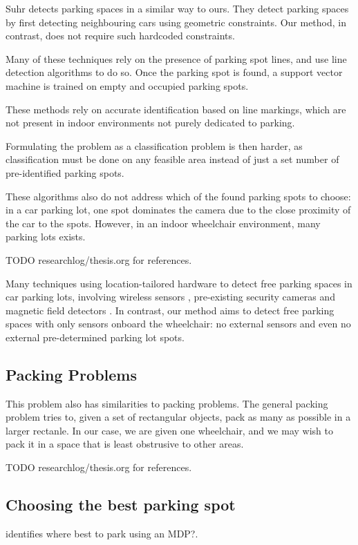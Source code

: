 Suhr \cite{suhr2010automatic} detects parking spaces in a similar way to ours.
They detect parking spaces by first detecting neighbouring cars using geometric
constraints. Our method, in contrast, does not require such hardcoded
constraints.


Many of these techniques rely on the presence of parking spot
lines, and use line detection algorithms to do so. Once the parking spot is
found, a support vector machine is trained on empty and occupied parking spots.

These methods rely on accurate identification based on line markings, which are
not present in indoor environments not purely dedicated to parking. 

Formulating the problem as a classification problem is then harder, as
classification must be done on any feasible area instead of just a set number of
pre-identified parking spots.

These algorithms also do not address which of the found parking spots to choose:
in a car parking lot, one spot dominates the camera due to the close proximity
of the car to the spots. However, in an indoor wheelchair environment, many
parking lots exists.

TODO researchlog/thesis.org for references.

Many techniques using location-tailored hardware to detect free parking spaces
in car parking lots, involving wireless sensors \cite{panja2011wirelessly},
pre-existing security cameras \cite{true2007vacant} and magnetic field detectors
\cite{boda2007design}. In contrast, our method aims to detect free parking
spaces with only sensors onboard the wheelchair: no external sensors and even no
external pre-determined parking lot spots.


\subsection{Packing Problems}
This problem also has similarities to packing problems. The general packing
problem tries to, given a set of rectangular objects, pack as many as possible
in a larger rectanle. In our case, we are given one wheelchair, and we may wish
to pack it in a space that is least obstrusive to other areas.

TODO researchlog/thesis.org for references.

\subsection{Choosing the best parking spot}
\cite{bogoslavskyi2015where} identifies where best to park using an MDP?.

